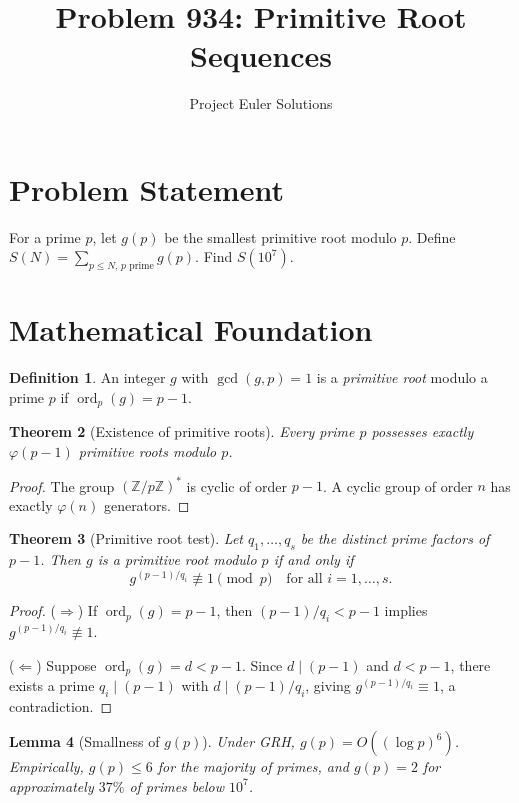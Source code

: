 \documentclass[11pt]{article}
\title{Problem 934: Primitive Root Sequences}
\author{Project Euler Solutions}
\date{}
\newtheorem{theorem}{Theorem}
\newtheorem{lemma}[theorem]{Lemma}
\theoremstyle{definition}
\newtheorem{definition}[theorem]{Definition}
\begin{document}
\maketitle

\section{Problem Statement}

For a prime $p$, let $g(p)$ be the smallest primitive root modulo $p$. Define $S(N) = \sum_{p \leq N,\, p \text{ prime}} g(p)$. Find $S(10^7)$.

\section{Mathematical Foundation}

\begin{definition}
An integer $g$ with $\gcd(g, p) = 1$ is a \emph{primitive root} modulo a prime $p$ if $\operatorname{ord}_p(g) = p - 1$.
\end{definition}

\begin{theorem}[Existence of primitive roots]
Every prime $p$ possesses exactly $\varphi(p - 1)$ primitive roots modulo $p$.
\end{theorem}

\begin{proof}
The group $(\mathbb{Z}/p\mathbb{Z})^*$ is cyclic of order $p - 1$. A cyclic group of order $n$ has exactly $\varphi(n)$ generators.
\end{proof}

\begin{theorem}[Primitive root test]
Let $q_1, \ldots, q_s$ be the distinct prime factors of $p - 1$. Then $g$ is a primitive root modulo $p$ if and only if
\[
g^{(p-1)/q_i} \not\equiv 1 \pmod{p} \quad \text{for all } i = 1, \ldots, s.
\]
\end{theorem}

\begin{proof}
($\Rightarrow$) If $\operatorname{ord}_p(g) = p - 1$, then $(p-1)/q_i < p - 1$ implies $g^{(p-1)/q_i} \not\equiv 1$.

($\Leftarrow$) Suppose $\operatorname{ord}_p(g) = d < p - 1$. Since $d \mid (p-1)$ and $d < p-1$, there exists a prime $q_i \mid (p-1)$ with $d \mid (p-1)/q_i$, giving $g^{(p-1)/q_i} \equiv 1$, a contradiction.
\end{proof}

\begin{lemma}[Smallness of $g(p)$]
Under GRH, $g(p) = O((\log p)^6)$. Empirically, $g(p) \leq 6$ for the majority of primes, and $g(p) = 2$ for approximately $37\%$ of primes below $10^7$.
\end{lemma}
\end{document}
